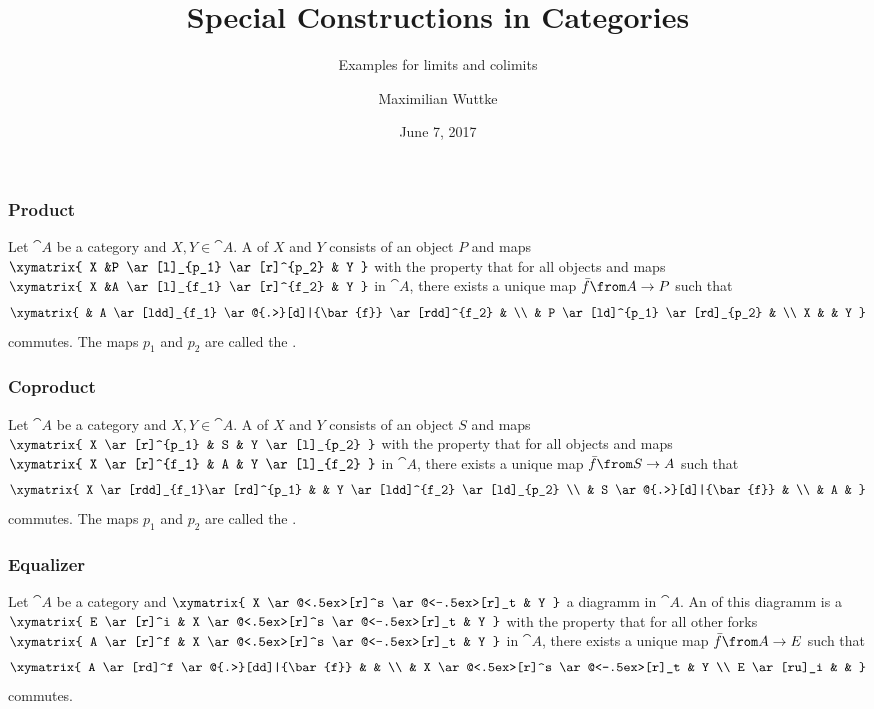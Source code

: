 \documentclass{beamer}
\title{Special Constructions in Categories}
\subtitle{Examples for limits and colimits}
\author{Maximilian Wuttke}
\date{June 7, 2017}
\begin{document}
\frame{\titlepage}

\begin{frame}
  \frametitle{Product}

  Let $\cat{A}$ be a category and $X, Y \in \cat{A}$.
  A  of $X$ and $Y$ consists of an object $P$ and maps \\
  $ \xymatrix{
    X &P \ar[l]_{p_1} \ar[r]^{p_2} & Y
  } $
  with the property that for all objects and maps \\
  $ \xymatrix{
    X &A \ar[l]_{f_1} \ar[r]^{f_2} & Y
  } $
  in $\cat{A}$, there exists a unique map $\bar{f}\from A \to P$ such that
  \[ \xymatrix{
    & A \ar[ldd]_{f_1} \ar@{.>}[d]|{\bar{f}} \ar[rdd]^{f_2} & \\
    & P \ar[ld]^{p_1} \ar[rd]_{p_2} & \\
    X & & Y
  } \]
  commutes. The maps $p_1$ and $p_2$ are called the .

\end{frame}

\begin{frame}
  \frametitle{Coproduct}

  Let $\cat{A}$ be a category and $X, Y \in \cat{A}$.
  A  of $X$ and $Y$ consists of an object $S$ and maps \\
  $ \xymatrix{
    X \ar[r]^{p_1} & S & Y \ar[l]_{p_2}
  } $
  with the property that for all objects and maps \\
  $ \xymatrix{
    X \ar[r]^{f_1} & A & Y \ar[l]_{f_2}
  } $
  in $\cat{A}$, there exists a unique map $\bar{f}\from S \to A$ such that
  \[ \xymatrix{
    X \ar[rdd]_{f_1}\ar[rd]^{p_1} & & Y \ar[ldd]^{f_2} \ar[ld]_{p_2} \\
    & S \ar@{.>}[d]|{\bar{f}} & \\
    & A &
  } \]
  commutes. The maps $p_1$ and $p_2$ are called the .
\end{frame}

\begin{frame}
  \frametitle{Equalizer}

  Let $\cat{A}$ be a category and
  $ \xymatrix{
    X \ar@<.5ex>[r]^s \ar@<-.5ex>[r]_t & Y
  } $
  a diagramm in $\cat{A}$.
  An  of this diagramm is a  \\
  $ \xymatrix{
    E \ar[r]^i & X \ar@<.5ex>[r]^s \ar@<-.5ex>[r]_t & Y
  } $
  with the property that for all other forks
  $ \xymatrix{
    A \ar[r]^f & X \ar@<.5ex>[r]^s \ar@<-.5ex>[r]_t & Y
  } $
  in $\cat{A}$, there exists a unique map $\bar{f}\from A \to E$ such that
  \[ \xymatrix{
    A \ar[rd]^f \ar@{.>}[dd]|{\bar{f}} & & \\
    & X \ar@<.5ex>[r]^s \ar@<-.5ex>[r]_t & Y \\
    E \ar[ru]_i & &
  } \]
  commutes.
\end{frame}
\end{document}

